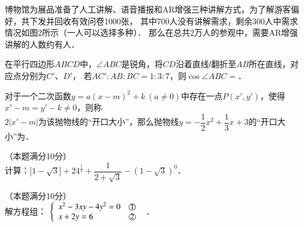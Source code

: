 \documentclass{article}
\begin{document}
\begin{question}[16]
    \item 博物馆为展品准备了人工讲解、语音播报和AR增强三种讲解方式，为了解游客偏好，共下发并回收有效问卷1000张，
          其中700人没有讲解需求，剩余300人中需求情况如图2所示（一人可以选择多种）．
          那么在总共2万人的参观中，需要AR增强讲解的人数约有\blank 人．
\end{question}

\begin{question}[17]
    \item 在平行四边形$ABCD$中，$\angle ABC$是锐角，将$CD$沿着直线$l$翻折至$AB$所在直线，对应点分别为$C'$、$D'$，
          若$AC':AB:BC=1:3:7$，则$\cos \angle ABC=$\blank ．
\end{question}

\begin{question}[18]
    \item 对于一个二次函数$y=a(x-m)^2+k~(a\neq 0)$中存在一点$P(x',y')$，使得$x'-m=y'-k\neq 0$，则称 \\[5pt]
          $2|x'-m|$为该抛物线的“开口大小”，那么抛物线$y=-\dfrac{1}{2}x^2+\dfrac{1}{3}x+3$的“开口大小”为\blank ．
\end{question}


\begin{question}[19]
    \item （本题满分10分）\\[5pt]
          计算：$|1-\sqrt{3}|+24^\frac{1}{2}+\dfrac{1}{2+\sqrt{3}}-(1-\sqrt{3})^0$．
\end{question}

\newpage

\lfoot{}
\cfoot{}

\begin{question}[20]
    \item （本题满分10分）\\[5pt]
        解方程组：
        $\left\{
            \begin{array}{lr}
            x^2-3xy-4y^2=0 & \text{\normalsize{\textcircled{\small{1}}}\normalsize\enspace} \\
            x+2y=6 & \text{\normalsize{\textcircled{\small{2}}}\normalsize\enspace}
        \end{array}\right.$．
\end{question} \leavevmode \\
\end{document}
